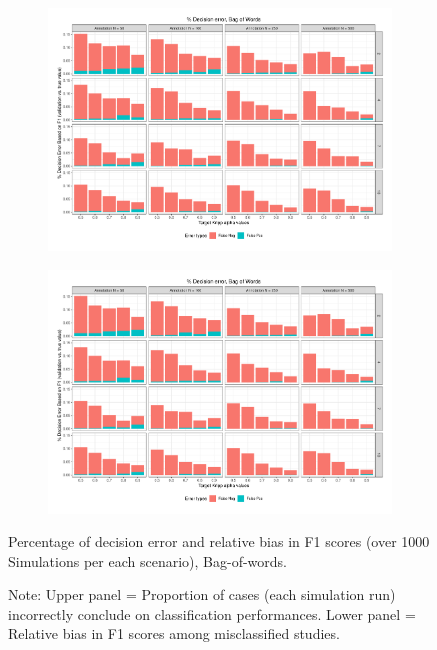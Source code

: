 \documentclass[man, 12pt, a4paper, nolmodern, noextraspace]{apa6}
\begin{document}
\begin{figure}
    \centering
    \begin{subfigure}[t]{0.95\textwidth}
        \centering
        \includegraphics[clip, width=\linewidth, page = 1]{Results/BoW_summary_05.pdf} 
    \end{subfigure}
    \begin{subfigure}[t]{0.95\textwidth}
        \centering
        \includegraphics[clip, width=\linewidth, page = 2]{Results/BoW_summary_05.pdf} 
    \end{subfigure}
    
    \captionsetup{format=hang}
    \caption{Percentage of decision error and relative bias in F1 scores (over 1000 Simulations per each scenario), Bag-of-words.} 
    \label{fig:Figure4}
    \captionsetup{font=small}
    \caption*{Note: Upper panel = Proportion of cases (each simulation run) incorrectly conclude on classification performances. Lower panel = Relative bias in F1 scores among misclassified studies.}
\end{figure}     
\end{document}
